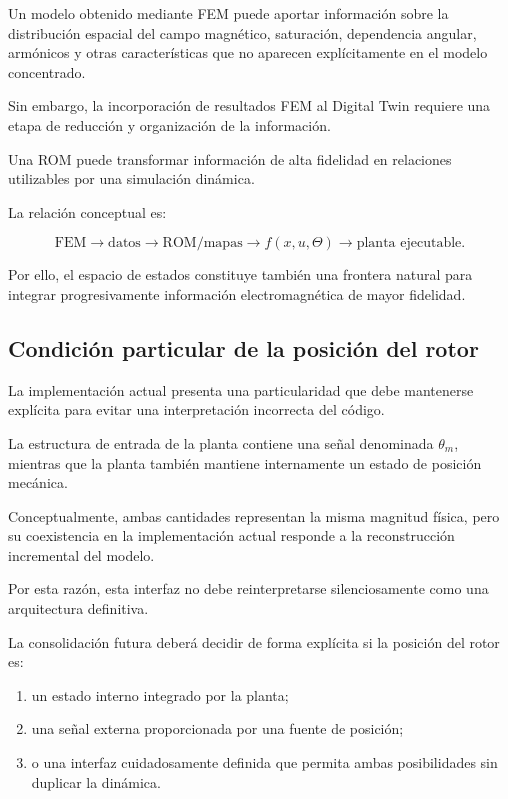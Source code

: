 Un modelo obtenido mediante FEM puede aportar información sobre la distribución espacial del campo magnético, saturación, dependencia angular, armónicos y otras características que no aparecen explícitamente en el modelo concentrado.

Sin embargo, la incorporación de resultados FEM al Digital Twin requiere una etapa de reducción y organización de la información.

Una ROM puede transformar información de alta fidelidad en relaciones utilizables por una simulación dinámica.

La relación conceptual es:

\begin{equation}
\mathrm{FEM}
\rightarrow
\mathrm{datos}
\rightarrow
\mathrm{ROM/mapas}
\rightarrow
f(x,u,\Theta)
\rightarrow
\text{planta ejecutable}.
\end{equation}

Por ello, el espacio de estados constituye también una frontera natural para integrar progresivamente información electromagnética de mayor fidelidad.

\subsection{Condición particular de la posición del rotor}

La implementación actual presenta una particularidad que debe mantenerse explícita para evitar una interpretación incorrecta del código.

La estructura de entrada de la planta contiene una señal denominada $\theta_m$, mientras que la planta también mantiene internamente un estado de posición mecánica.

Conceptualmente, ambas cantidades representan la misma magnitud física, pero su coexistencia en la implementación actual responde a la reconstrucción incremental del modelo.

Por esta razón, esta interfaz no debe reinterpretarse silenciosamente como una arquitectura definitiva.

La consolidación futura deberá decidir de forma explícita si la posición del rotor es:

\begin{enumerate}
    \item un estado interno integrado por la planta;
    \item una señal externa proporcionada por una fuente de posición;
    \item o una interfaz cuidadosamente definida que permita ambas posibilidades sin duplicar la dinámica.
\end{enumerate}

